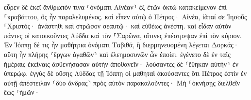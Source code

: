 \documentclass{openreader}
\begin{document}
εὗρεν δὲ ἐκεῖ ἄνθρωπόν τινα ⸂ὀνόματι Αἰνέαν⸃ ἐξ ἐτῶν ὀκτὼ κατακείμενον ἐπὶ ⸀κραβάττου, ὃς ἦν παραλελυμένος. 
καὶ εἶπεν αὐτῷ ὁ Πέτρος· Αἰνέα, ἰᾶταί σε Ἰησοῦς ⸀Χριστός· ἀνάστηθι καὶ στρῶσον σεαυτῷ· καὶ εὐθέως ἀνέστη. 
καὶ εἶδαν αὐτὸν πάντες οἱ κατοικοῦντες Λύδδα καὶ τὸν ⸀Σαρῶνα, οἵτινες ἐπέστρεψαν ἐπὶ τὸν κύριον. 
Ἐν Ἰόππῃ δέ τις ἦν μαθήτρια ὀνόματι Ταβιθά, ἣ διερμηνευομένη λέγεται Δορκάς· αὕτη ἦν πλήρης ⸂ἔργων ἀγαθῶν⸃ καὶ ἐλεημοσυνῶν ὧν ἐποίει. 
ἐγένετο δὲ ἐν ταῖς ἡμέραις ἐκείναις ἀσθενήσασαν αὐτὴν ἀποθανεῖν· λούσαντες δὲ ⸂ἔθηκαν αὐτὴν⸃ ἐν ὑπερῴῳ. 
ἐγγὺς δὲ οὔσης Λύδδας τῇ Ἰόππῃ οἱ μαθηταὶ ἀκούσαντες ὅτι Πέτρος ἐστὶν ἐν αὐτῇ ἀπέστειλαν ⸂δύο ἄνδρας⸃ πρὸς αὐτὸν παρακαλοῦντες· Μὴ ⸀ὀκνήσῃς διελθεῖν ἕως ⸀ἡμῶν· 
\end{document}
